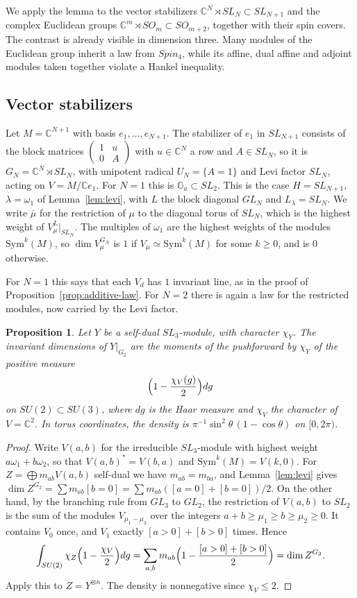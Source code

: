 \documentclass[11pt,reqno]{amsart}
\newtheorem{proposition}[theorem]{Proposition}
\theoremstyle{definition}
\newcommand{\CC}{\mathbb C}
\newcommand{\Ga}{\mathbb G_a}
\begin{document}
We apply the lemma to the vector stabilizers $\CC^N\rtimes SL_N\subset SL_{N+1}$ and the complex Euclidean groups $\CC^m\rtimes SO_m\subset SO_{m+2}$, together with their spin covers. The contrast is already visible in dimension three. Many modules of the Euclidean group inherit a law from $Spin_4$, while its affine, dual affine and adjoint modules taken together violate a Hankel inequality.

\subsection{Vector stabilizers}
Let $M=\CC^{N+1}$ with basis $e_1,\ldots,e_{N+1}$. The stabilizer of $e_1$ in $SL_{N+1}$ consists of the block matrices $\left(\begin{smallmatrix}1&u\\0&A\end{smallmatrix}\right)$ with $u\in\CC^N$ a row and $A\in SL_N$, so it is $G_N=\CC^N\rtimes SL_N$, with unipotent radical $U_N=\{A=1\}$ and Levi factor $SL_N$, acting on $V=M/\CC e_1$. For $N=1$ this is $\Ga\subset SL_2$. This is the case $H=SL_{N+1}$, $\lambda=\omega_1$ of Lemma~\ref{lem:levi}, with $L$ the block diagonal $GL_N$ and $L_\lambda=SL_N$. We write $\bar\mu$ for the restriction of $\mu$ to the diagonal torus of $SL_N$, which is the highest weight of $V^L_\mu|_{SL_N}$. The multiples of $\omega_1$ are the highest weights of the modules $\mathrm{Sym}^k(M)$, so $\dim V_\mu^{G_N}$ is $1$ if $V_\mu\simeq\mathrm{Sym}^k(M)$ for some $k\geq0$, and is $0$ otherwise.

For $N=1$ this says that each $V_d$ has $1$ invariant line, as in the proof of Proposition~\ref{prop:additive-law}. For $N=2$ there is again a law for the restricted modules, now carried by the Levi factor.

\begin{proposition}\label{prop:tilted-haar}
Let $Y$ be a self-dual $SL_3$-module, with character $\chi_Y$. The invariant dimensions of $Y|_{G_2}$ are the moments of the pushforward by $\chi_Y$ of the positive measure
\[
     \Bigl(1-\frac{\chi_V(g)}2\Bigr)dg
\]
on $SU(2)\subset SU(3)$, where $dg$ is the Haar measure and $\chi_V$ the character of $V=\CC^2$. In torus coordinates, the density is $\pi^{-1}\sin^2\theta\,(1-\cos\theta)$ on $[0,2\pi)$.
\end{proposition}

\begin{proof}
Write $V(a,b)$ for the irreducible $SL_3$-module with highest weight $a\omega_1+b\omega_2$, so that $V(a,b)^*=V(b,a)$ and $\mathrm{Sym}^k(M)=V(k,0)$. For $Z=\bigoplus m_{ab}V(a,b)$ self-dual we have $m_{ab}=m_{ba}$, and Lemma~\ref{lem:levi} gives $\dim Z^{G_2}=\sum m_{ab}[b=0]=\sum m_{ab}([a=0]+[b=0])/2$. On the other hand, by the branching rule from $GL_3$ to $GL_2$, the restriction of $V(a,b)$ to $SL_2$ is the sum of the modules $V_{\mu_1-\mu_2}$ over the integers $a+b\geq\mu_1\geq b\geq\mu_2\geq0$. It contains $V_0$ once, and $V_1$ exactly $[a>0]+[b>0]$ times. Hence
\[
 \int_{SU(2)}\chi_Z\Bigl(1-\frac{\chi_V}2\Bigr)dg=\sum_{a,b}m_{ab}\Bigl(1-\frac{[a>0]+[b>0]}2\Bigr)=\dim Z^{G_2}.
\]
Apply this to $Z=Y^{\otimes n}$. The density is nonnegative since $\chi_V\leq2$.
\end{proof}
\end{document}
